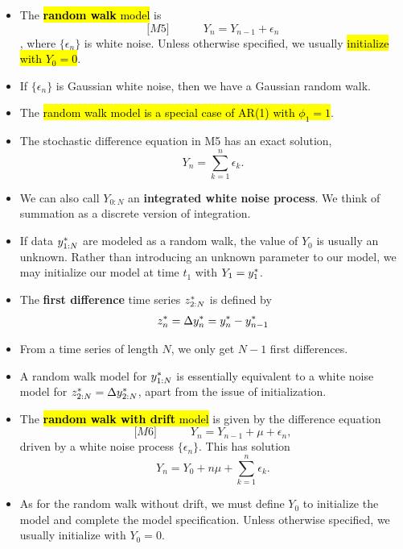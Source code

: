 \documentclass[]{article}
\begin{document}
\begin{itemize}
\item
  The \hl{\textbf{random walk} model} is $${[}M5{]}
  \quad\quad\quad Y_n = Y_{n-1} + \epsilon_n$$, where
  \(\{\epsilon_n\}\) is white noise. Unless otherwise specified, we
  usually \hl{initialize with $Y_0=0$}.
\item
  If \(\{\epsilon_n\}\) is Gaussian white noise, then we have a Gaussian
  random walk.
\item
  The \hl{random walk model is a special case of AR(1) with $\phi_1=1$}.
\item
  The stochastic difference equation in M5 has an exact solution,
  \[ Y_n = \sum_{k=1}^n\epsilon_k.\]
\item
  We can also call \(Y_{0:N}\) an \textbf{integrated white noise
  process}. We think of summation as a discrete version of integration.
\item
  If data \(y_{1:N}^*\) are modeled as a random walk, the value of
  \(Y_0\) is usually an unknown. Rather than introducing an unknown
  parameter to our model, we may initialize our model at time \(t_1\)
  with \(Y_1=y_1^*\).
\item
  The \textbf{first difference} time series \(z_{2:N}^*\) is
  defined by
  \[ z_n^*= \Delta y_n^* = y_{n}^*-y_{n-1}^*\]
\item
  From a time series of length \(N\), we only get \(N-1\) first
  differences.
\item
  A random walk model for \(y_{1:N}^*\) is essentially equivalent
  to a white noise model for \(z_{2:N}^*= \Delta y_{2:N}^*\),
  apart from the issue of initialization.
\item
  The \hl{\textbf{random walk with drift} model} is given by the difference
  equation $${[}M6{]}
  \quad\quad\quad Y_n = Y_{n-1} + \mu + \epsilon_n,$$ driven by a
  white noise process \(\{\epsilon_n\}\). This has solution
  \[ Y_n = Y_0 + n\mu + \sum_{k=1}^n\epsilon_k.\]
\item
  As for the random walk without drift, we must define \(Y_0\) to
  initialize the model and complete the model specification. Unless
  otherwise specified, we usually initialize with \(Y_0=0\).
\end{itemize}
\end{document}
